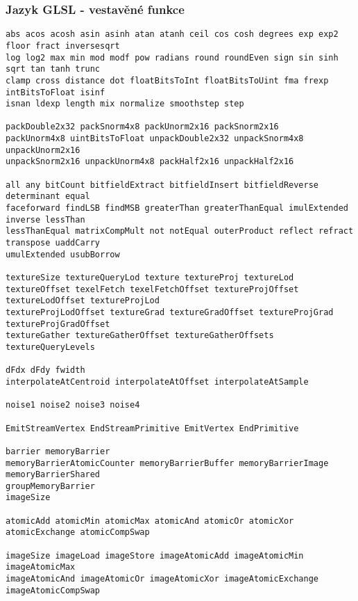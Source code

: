 \begin{frame}[fragile]
\frametitle{Jazyk GLSL - vestavěné funkce}
{\tiny
\begin{verbatim}
abs acos acosh asin asinh atan atanh ceil cos cosh degrees exp exp2 floor fract inversesqrt
log log2 max min mod modf pow radians round roundEven sign sin sinh sqrt tan tanh trunc
clamp cross distance dot floatBitsToInt floatBitsToUint fma frexp intBitsToFloat isinf
isnan ldexp length mix normalize smoothstep step

packDouble2x32 packSnorm4x8 packUnorm2x16 packSnorm2x16
packUnorm4x8 uintBitsToFloat unpackDouble2x32 unpackSnorm4x8 unpackUnorm2x16 
unpackSnorm2x16 unpackUnorm4x8 packHalf2x16 unpackHalf2x16

all any bitCount bitfieldExtract bitfieldInsert bitfieldReverse determinant equal
faceforward findLSB findMSB greaterThan greaterThanEqual imulExtended inverse lessThan
lessThanEqual matrixCompMult not notEqual outerProduct reflect refract transpose uaddCarry
umulExtended usubBorrow 

textureSize textureQueryLod texture textureProj textureLod 
textureOffset texelFetch texelFetchOffset textureProjOffset textureLodOffset textureProjLod 
textureProjLodOffset textureGrad textureGradOffset textureProjGrad textureProjGradOffset 
textureGather textureGatherOffset textureGatherOffsets textureQueryLevels

dFdx dFdy fwidth
interpolateAtCentroid interpolateAtOffset interpolateAtSample

noise1 noise2 noise3 noise4

EmitStreamVertex EndStreamPrimitive EmitVertex EndPrimitive

barrier memoryBarrier 
memoryBarrierAtomicCounter memoryBarrierBuffer memoryBarrierImage memoryBarrierShared 
groupMemoryBarrier
imageSize

atomicAdd atomicMin atomicMax atomicAnd atomicOr atomicXor atomicExchange atomicCompSwap

imageSize imageLoad imageStore imageAtomicAdd imageAtomicMin imageAtomicMax
imageAtomicAnd imageAtomicOr imageAtomicXor imageAtomicExchange imageAtomicCompSwap
\end{verbatim}
}
\end{frame}

